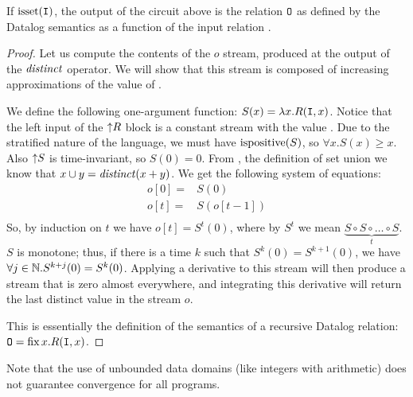 \begin{theorem}\label{theorem:recursion}
If $\mbox{isset}(\mbox{\texttt{I}})$, the output of the circuit above is
the relation $\mbox{\texttt{O}}$ as defined by the Datalog semantics 
as a function of the input relation .
\end{theorem}
\label{proof-recursion}
\begin{proof}
Let us compute the contents of the $o$ stream, produced at the output
of the $\mathit{distinct}$ operator.  We will show that this stream is composed
of increasing approximations of the value of .

We define the following one-argument function: $S(x) = \lambda x . R(\mbox{\texttt{I}}, x)$.
Notice that the left input of the ${\uparrow}R$ block is a constant stream
with the value .  Due to the stratified nature of the language,
we must have $\mbox{ispositive}(S)$, so $\forall x . S(x) \geq x$.
Also ${\uparrow}S$ is time-invariant, so $S(0) = 0$.
From , the definition of set union we know that
$x \cup y = \mathit{distinct}(x + y)$.
We get the following system of equations:
$$
\begin{aligned}
o[0] =& S(0) \\
o[t] =& S(o[t-1]) \\
\end{aligned}
$$ 
So, by induction on $t$ we have $o[t] = S^t(0)$, where by 
$S^t$ we mean $\underbrace{S \circ S \circ \ldots \circ S}_{t}$.
$S$ is monotone; thus, if there is a time $k$ such that $S^k(0) = S^{k+1}(0)$, we have 
$\forall j \in \mathbb{N} . S^{k+j}(0) = S^k(0)$.  Applying a derivative to this stream
will then produce a stream that is zero almost everywhere, and integrating
this derivative will return the last distinct value in the stream $o$.

This is essentially the definition of the semantics of a recursive Datalog relation:
$\mbox{\texttt{O}} = \mbox{fix}\,x.R(\mbox{\texttt{I}}, x)$.
\end{proof}

Note that the use of unbounded data domains (like integers with arithmetic) does 
not guarantee convergence for all programs.

